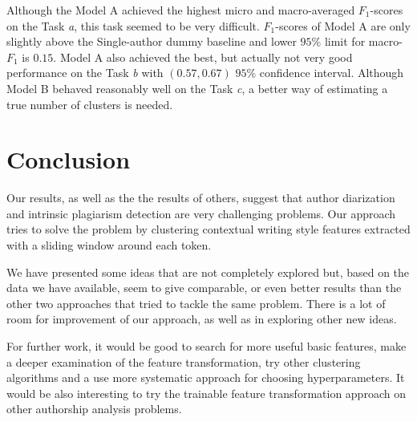 \documentclass[10pt, a4paper]{article}
\begin{document}
Although the Model A achieved the highest micro and macro-averaged $F_1$-scores on the Task \emph{a}, this task seemed to be very difficult. $F_1$-scores of Model A are only slightly above the Single-author dummy baseline and lower $95\%$ limit for macro-$F_1$ is $0.15$. Model A also achieved the best, but actually not very good performance on the Task \emph{b} with $(0.57, 0.67)$ $95\%$ confidence interval. Although Model B behaved reasonably well on the Task \emph{c}, a better way of estimating a true number of clusters is needed.


\section{Conclusion}

Our results, as well as the the results of others, suggest that author diarization and intrinsic plagiarism detection are very challenging problems. Our approach tries to solve the problem by clustering contextual writing style features extracted with a sliding window around each token. 

We have presented some ideas that are not completely explored but, based on the data we have available, seem to give comparable, or even better results than the other two approaches that tried to tackle the same problem. There is a lot of room for improvement of our approach, as well as in exploring other new ideas.

For further work, it would be good to search for more useful basic features, make a deeper examination of the feature transformation, try other clustering algorithms and a use more systematic approach for choosing hyperparameters. It would be also interesting to try the trainable feature transformation approach on other authorship analysis problems.




\end{document}

